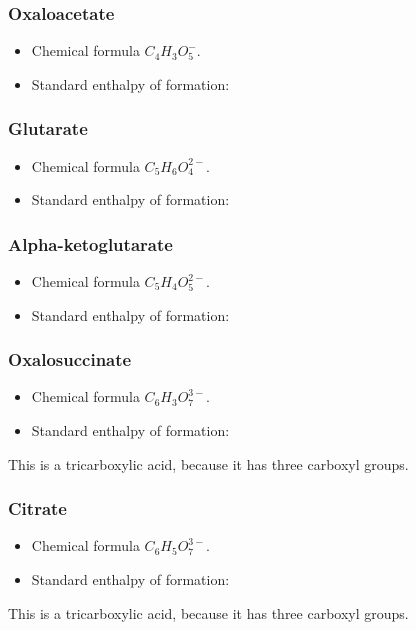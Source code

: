 \documentclass[a4paper,14pt]{extarticle}
\begin{document}
\subsubsection{Oxaloacetate}
\begin{itemize}
    \item Chemical formula $C_4H_3O_5^-$.
    \item Standard enthalpy of formation:
\end{itemize}

\subsubsection{Glutarate}
\begin{itemize}
    \item Chemical formula $C_5H_6O_4^{2-}$.
    \item Standard enthalpy of formation:
\end{itemize}

\subsubsection{Alpha-ketoglutarate}
\begin{itemize}
    \item Chemical formula $C_5H_4O_5^{2-}$.
    \item Standard enthalpy of formation:
\end{itemize}

\subsubsection{Oxalosuccinate}
\begin{itemize}
    \item Chemical formula $C_6H_3O_7^{3-}$.
    \item Standard enthalpy of formation:
\end{itemize}
This is a tricarboxylic acid, because it has three carboxyl groups.

\subsubsection{Citrate}
\begin{itemize}
    \item Chemical formula $C_6H_5O_7^{3-}$.
    \item Standard enthalpy of formation:
\end{itemize}
This is a tricarboxylic acid, because it has three carboxyl groups.
\end{document}
